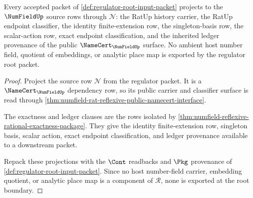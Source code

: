 \begin{theorem}
\label{thm:regulator-numfield-carrier-boundary}
Every accepted packet of \autoref{def:regulator-root-input-packet} projects to
the $\NumFieldUp$ source rows through $\mathcal{N}$: the RatUp history carrier,
the RatUp endpoint classifier, the identity finite-extension row, the
singleton-basis row, the scalar-action row, exact endpoint classification, and
the inherited ledger provenance of the public $\NameCert_{\NumFieldUp}$
surface. No ambient host number field, quotient of embeddings, or analytic
place map is exported by the regulator root packet.
\end{theorem}
\begin{proof}
Project the source row $\mathcal{N}$ from the regulator packet. It is a
$\NameCert_{\NumFieldUp}$ dependency row, so its public carrier and classifier
surface is read through
\autoref{thm:numfield-rat-reflexive-public-namecert-interface}.

The exactness and ledger clauses are the rows isolated by
\autoref{thm:numfield-reflexive-rational-exactness-package}. They give the
identity finite-extension row, singleton basis, scalar action, exact endpoint
classification, and ledger provenance available to a downstream packet.

Repack these projections with the $\Cont$ readbacks and $\Pkg$ provenance of
\autoref{def:regulator-root-input-packet}. Since no host number-field carrier,
embedding quotient, or analytic place map is a component of $\mathcal{R}$, none
is exported at the root boundary.
\end{proof}

